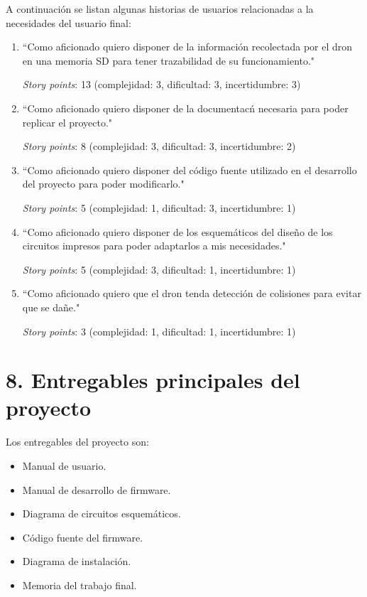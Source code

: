 \documentclass[
11pt, %
]{charter}
\begin{document}
	A continuaci\'on se listan algunas historias de usuarios relacionadas a la necesidades del usuario final:
	
	\begin{enumerate}
		\item ``Como aficionado quiero disponer de la informaci\'on recolectada por el dron en una memoria SD para tener trazabilidad de su funcionamiento."
		
		\textit{Story points}: 13 (complejidad: 3, dificultad: 3, incertidumbre: 3)
		
		\item ``Como aficionado quiero disponer de la documentac\'n necesaria para poder replicar el proyecto."

		\textit{Story points}: 8 (complejidad: 3, dificultad: 3, incertidumbre: 2)
		
		\item ``Como aficionado quiero disponer del c\'odigo fuente utilizado en el desarrollo del proyecto para poder 		modificarlo."

		\textit{Story points}: 5 (complejidad: 1, dificultad: 3, incertidumbre: 1)
		
		\item ``Como aficionado quiero disponer de los esquem\'aticos del dise\~no de los circuitos impresos para poder adaptarlos a mis necesidades."

		\textit{Story points}: 5 (complejidad: 3, dificultad: 1, incertidumbre: 1)
		
		\item ``Como aficionado quiero que el dron tenda detecci\'on de colisiones para evitar que se da\~ne."

		\textit{Story points}: 3 (complejidad: 1, dificultad: 1, incertidumbre: 1)
				
	\end{enumerate}

\section{8. Entregables principales del proyecto}
\label{sec:entregables}

	Los entregables del proyecto son:

	\begin{itemize}
		\item Manual de usuario.
		\item Manual de desarrollo de firmware. 
		\item Diagrama de circuitos esquemáticos.
		\item Código fuente del firmware.
		\item Diagrama de instalación.
		\item Memoria del trabajo final.
	\end{itemize}
\end{document}
